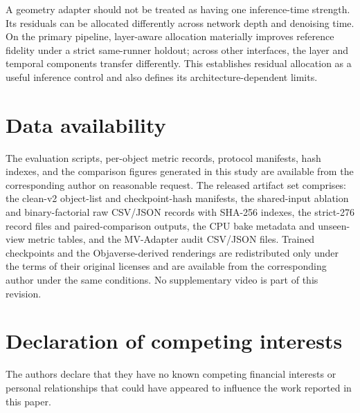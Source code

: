 \documentclass[times,twocolumn,final]{elsarticle}
\begin{document}
A geometry adapter should not be treated as having one inference-time
strength. Its residuals can be allocated differently across network depth
and denoising time. On the primary pipeline, layer-aware allocation
materially improves reference fidelity under a strict same-runner holdout;
across other interfaces, the layer and temporal components transfer
differently. This establishes residual allocation as a useful inference
control and also defines its architecture-dependent limits.

\section*{Data availability}

The evaluation scripts, per-object metric records, protocol manifests, hash
indexes, and the comparison figures generated in this study are available
from the corresponding author on reasonable request. The released artifact
set comprises: the clean-v2 object-list and checkpoint-hash manifests, the
shared-input ablation and binary-factorial raw CSV/JSON records with
SHA-256 indexes, the strict-276 record files and paired-comparison outputs,
the CPU bake metadata and unseen-view metric tables, and the MV-Adapter audit
CSV/JSON files. Trained checkpoints and the Objaverse-derived renderings are
redistributed only under the terms of their original licenses and are
available from the corresponding author under the same conditions. No
supplementary video is part of this revision.

\section*{Declaration of competing interests}

The authors declare that they have no known competing financial interests or personal relationships that could have appeared to influence the work reported in this paper.
\end{document}
